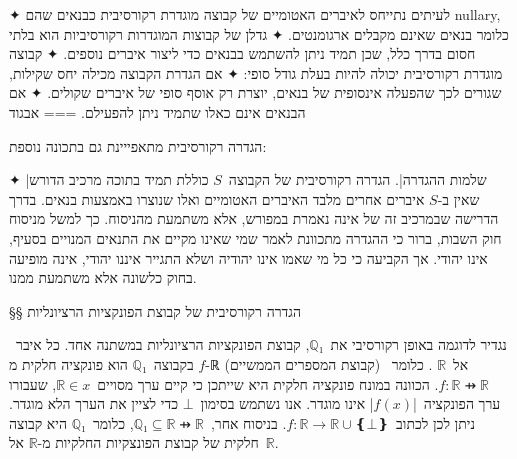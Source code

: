 ✦ לעיתים נתייחס לאיברים האטומיים של קבוצה מוגדרת רקורסיבית כבנאים שהם nullary,
כלומר בנאים שאינם מקבלים ארגומנטים.
✦ גדלן של קבוצות המוגדרות רקורסיביות הוא בלתי חסום בדרך כלל, שכן תמיד ניתן
להשתמש בבנאים כדי ליצור איברים נוספים.
✦ קבוצה מוגדרת רקורסיבית יכולה להיות בעלת גודל סופי:
✦ אם הגדרת הקבוצה מכילה יחס שקילות, שגורים לכך שהפעלה אינסופית של בנאים, יוצרת
רק אוסף סופי של איברים שקולים.
✦ אם הבנאים אינם כאלו שתמיד ניתן להפעילם.
===
{אבגוד}

הגדרה רקורסיבית מתאפייינת גם בתכונה נוספת:
\begin{itemize}
  ✦ \ע|שלמות ההגדרה|. הגדרה רקורסיבית של הקבוצה~$S$ כוללת תמיד בתוכה מרכיב
  הדורש שאין ב-$S$ איברים אחרים מלבד האיברים האטומיים ואלו שנוצרו באמצעות בנאים.
  בדרך הדרישה שבמרכיב זה של אינה נאמרת במפורש, אלא משתמעת מהניסוח. כך למשל מניסוח
  חוק השבות, ברור כי ההגדרה מתכוונת לאמר שמי שאינו מקיים את התנאים המנויים בסעיף,
  אינו יהודי. אך הקביעה כי כל מי שאמו אינו יהודיה ושלא התגייר איננו יהודי, אינה
  מופיעה בחוק כלשונה אלא משתמעת ממנו.
\end{itemize}

§§ הגדרה רקורסיבית של קבוצת הפונקציות הרציונליות

נגדיר לדוגמה באופן רקורסיבי את~$ℚ₁$, קבוצת הפונקציות הרציונליות במשתנה אחד. כל
איבר~$f$ בקבוצה~$ℚ₁$ הוא פונקציה חלקית מ-ℝ (קבוצת המספרים הממשיים) אל~$ℝ$ .
כלומר~$f:ℝ⇸ℝ$. הכוונה במונח פונקציה חלקית היא שייתכן כי קיים ערך מסויים~$ℝ∈x$,
שעבורו ערך הפונקציה~\E|$f(x)$| אינו מוגדר. אנו נשתמש בסימון~$⊥$ כדי לציין את הערך
הלא מוגדר. ניתן לכן לכתוב~$f:ℝ→ℝ∪❴⊥❵$. בניסוח אחר,~$ℚ₁⊆ℝ⇸ℝ$, כלומר~$ℚ₁$ היא
קבוצה חלקית של קבוצת הפונצקיות החלקיות מ-$ℝ$ אל~$ℝ$.

